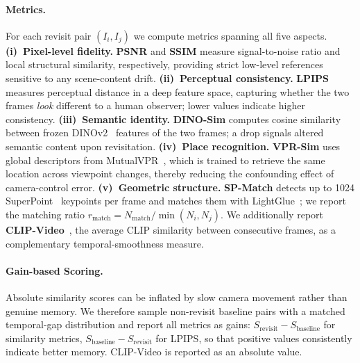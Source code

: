 \documentclass{llmxive}
\begin{document}
\paragraph{\bf{Metrics.}}
For each revisit pair $(I_i, I_j)$ we compute metrics
spanning all five aspects.
\textbf{(i)~Pixel-level fidelity.}
\textbf{PSNR} and \textbf{SSIM} measure signal-to-noise ratio
and local structural similarity, respectively,
providing strict low-level references sensitive to any scene-content drift.
\textbf{(ii)~Perceptual consistency.}
\textbf{LPIPS}~\citep{zhang2018lpips} measures perceptual distance
in a deep feature space,
capturing whether the two frames \emph{look} different to a human observer;
lower values indicate higher consistency.
\textbf{(iii)~Semantic identity.}
\textbf{DINO-Sim} computes cosine similarity
between frozen DINOv2~\citep{oquab2023dinov2} features of the two frames;
a drop signals altered semantic content upon revisitation.
\textbf{(iv)~Place recognition.}
\textbf{VPR-Sim} uses global descriptors
from MutualVPR~\citep{gu2026mutualvpr},
which is trained to retrieve the same location across viewpoint changes,
thereby reducing the confounding effect of camera-control error.
\textbf{(v)~Geometric structure.}
\textbf{SP-Match} detects up to 1024
SuperPoint~\citep{detone2018superpoint} keypoints per frame
and matches them with LightGlue~\citep{lindenberger2023lightglue};
we report the matching ratio
$r_{\text{match}} = N_{\text{match}} / \min(N_i, N_j)$.
We additionally report \textbf{CLIP-Video}~\citep{radford2021clip},
the average CLIP similarity between consecutive frames,
as a complementary temporal-smoothness measure.

\paragraph{\bf{Gain-based Scoring.}}
Absolute similarity scores can be inflated by slow camera movement
rather than genuine memory.
We therefore sample non-revisit baseline pairs
with a matched temporal-gap distribution
and report all metrics as gains:
$S_{\mathrm{revisit}} - S_{\mathrm{baseline}}$ for similarity metrics,
$S_{\mathrm{baseline}} - S_{\mathrm{revisit}}$ for LPIPS,
so that positive values consistently indicate better memory.
CLIP-Video is reported as an absolute value.
\end{document}
